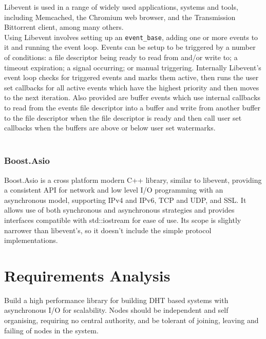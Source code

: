 \documentclass{article}
\begin{document}
Libevent is used in a range of widely used applications, systems and tools, including Memcached, the Chromium web browser, and the Transmission Bittorrent client, among many others.
\\
Using Libevent involves setting up an \texttt{event\_base}, adding one or more events to it and running the event loop. Events can be setup to be triggered by a number of conditions: a file descriptor being ready to read from and/or write to; a timeout expiration; a signal occurring; or manual triggering. Internally Libevent's event loop checks for triggered events and marks them active, then runs the user set callbacks for all active events which have the highest priority and then moves to the next iteration.
Also provided are buffer events which use internal callbacks to read from the events file descriptor into a buffer and write from another buffer to the file descriptor when the file descriptor is ready and then call user set callbacks when the buffers are above or below user set watermarks.
\\
\\

\subsubsection{Boost.Asio}
Boost.Asio\cite{basio} is a cross platform modern C++ library, similar to libevent, providing a consistent API for network and low level I/O programming with an asynchronous model, supporting IPv4 and IPv6, TCP and UDP, and SSL. It allows use of both synchronous and asynchronous strategies and provides interfaces compatible with std::iostream for ease of use.
Its scope is slightly narrower than libevent's, so it doesn't include the simple protocol implementations.



\section{Requirements Analysis}
Build a high performance library for building DHT based systems with asynchronous I/O for scalability. Nodes should be independent and self organising, requiring no central authority, and be tolerant of joining, leaving and failing of nodes in the system.
\end{document}
